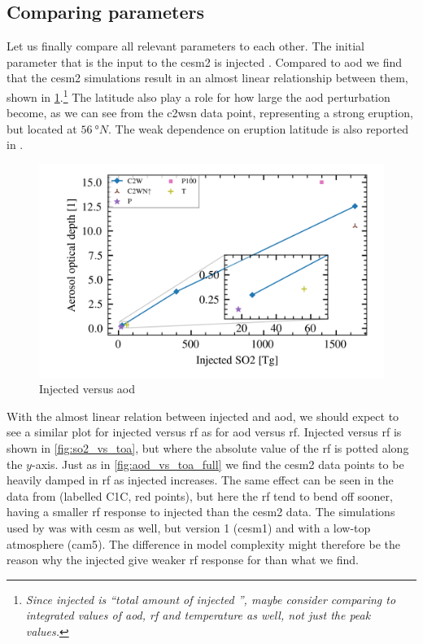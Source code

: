 \documentclass{ametsocV5}
\newcommand{\iso}[1][i]{{#1}njected \ce{SO2}}
\begin{document}
\subsection{Comparing parameters}

Let us finally compare all relevant parameters to each other. The initial parameter that
is the input to the \acrshort{cesm2} is injected . Compared to \acrshort{aod} we
find that the \acrshort{cesm2} simulations result in an almost linear relationship
between them, shown in \cref{fig:so2_vs_aod}.\footnote{\emph{Since \iso{} is ``total
    amount of \iso{}'', maybe consider comparing to integrated values of \acrshort{aod},
    \acrshort{rf} and temperature as well, not just the peak values.}} The latitude also
play a role for how large the \acrshort{aod} perturbation become, as we can see from the
\acrshort{c2wsn} data point, representing a strong eruption, but located at \(
\SI{56}{\degree N} \). The weak dependence on eruption latitude is also reported in
\citet{marshall2019}.

\begin{figure}[t]
  \begin{center}
    \includegraphics[width=0.95\linewidth]{figures/injection_vs_aod.png}
  \end{center}
  \caption{Injected  versus \acrshort{aod}}%
  \label{fig:so2_vs_aod}
\end{figure}

With the almost linear relation between injected  and \acrshort{aod}, we should
expect to see a similar plot for \iso{} versus \acrshort{rf} as for \acrshort{aod}
versus \acrshort{rf}. \iso[I] versus \acrshort{rf} is shown in \cref{fig:so2_vs_toa},
but where the absolute value of the \acrshort{rf} is potted along the \( y \)-axis. Just
as in \cref{fig:aod_vs_toa_full} we find the \acrshort{cesm2} data points to be heavily
damped in \acrshort{rf} as \iso{} increases. The same effect can be seen in the data
from \citet{ottobliesner2016} (labelled C1C, red points), but here the \acrshort{rf}
tend to bend off sooner, having a smaller \acrshort{rf} response to \iso{} than the
\acrshort{cesm2} data. The simulations used by \citet{ottobliesner2016} was with
\acrshort{cesm} as well, but version 1 (\acrshort{cesm1}) and with a low-top atmosphere
(\acrshort{cam5}). The difference in model complexity might therefore be the reason why
the \iso{} give weaker \acrshort{rf} response for \citet{ottobliesner2016} than what we
find.
\end{document}
